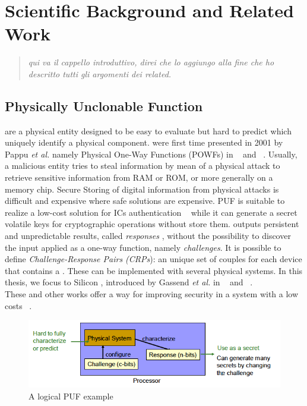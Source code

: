\documentclass[../tesi.tex]{subfiles}
\begin{document}
\chapter{Scientific Background and Related Work}
\begin{quotation}
\emph{qui va il cappello introduttivo, direi che lo aggiungo alla fine che ho descritto tutti gli argomenti dei related. }
\end{quotation}

\section{Physically Unclonable Function}
\puf{} are a physical entity designed to be easy to evaluate but hard to predict which uniquely identify a physical component.
\puf{} were first time presented in 2001 by Pappu \emph{et al.} namely Physical One-Way Functions (POWFs) in ~\cite{pappu2002physical} and ~\cite{ravikanth2001physical}. 
Usually, a malicious entity tries to steal information by mean of a physical attack to retrieve sensitive information from RAM or ROM, or more generally on a memory chip. 
Secure Storing of digital information from physical attacks is difficult and expensive where safe solutions are expensive. 
PUF is suitable to realize a low-cost solution for ICs authentication ~\cite{suh2007physical} while it can generate a secret volatile keys for cryptographic operations without store them. 
\puf{} outputs persistent and unpredictable results, called \emph{responses} , without the possibility to discover the input applied as a one-way function, namely \emph{challenges}.   
It is possible to define \emph{Challenge-Response Pairs (CRPs}): an unique set of couples for each device that contains a \puf{}. These can be implemented with several physical systems. In this thesis, we focus to Silicon , introduced by Gassend \emph{et al.} in  ~\cite{suh2007physical} and ~\cite{gassend2002silicon}. \\
These and other works offer a way for improving security in a system with a low costs ~\cite{guajardo2007fpga}. 
\begin{figure}
\centering
\includegraphics[scale=0.65]{images/firstpuf.png}
\caption{A logical PUF example}
\label{nome}
\end{figure}
\end{document}
